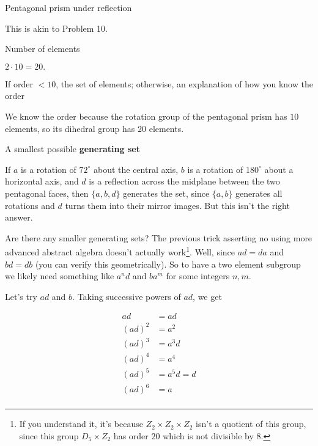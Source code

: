 \documentclass[../gatm_answers.tex]{subfiles}
\begin{document}
\begin{outer_problem}
\item Pentagonal prism under reflection
\end{outer_problem}

This is akin to Problem 10.

\begin{inner_problem}[start=1]
\item Number of elements
\end{inner_problem}

$2\cdot 10=20.$

\begin{inner_problem}
\item If order $< 10$, the set of elements; otherwise, an explanation of how you know the order
\end{inner_problem}

We know the order because the rotation group of the pentagonal prism has $10$ elements, so its dihedral group has $20$ elements.

\begin{inner_problem}
\item A smallest possible \textbf{generating set}
\end{inner_problem}

If $a$ is a rotation of $72^\circ$ about the central axis, $b$ is a rotation of $180^\circ$ about a horizontal axis, and $d$ is a reflection across the midplane between the two pentagonal faces, then $\{a,b,d\}$ generates the set, since $\{a,b\}$ generates all rotations and $d$ turns them into their mirror images. But this isn't the right answer.

Are there any smaller generating sets? The previous trick asserting no using more advanced abstract algebra doesn't actually work\footnote{If you understand it, it's because $Z_2\times Z_2\times Z_2$ isn't a quotient of this group, since this group $D_5 \times Z_2$ has order $20$ which is not divisible by $8$.}. Well, since $ad=da$ and $bd=db$ (you can verify this geometrically). So to have a two element subgroup we likely need something like $a^nd$ and $ba^m$ for some integers $n,m$.

Let's try $ad$ and $b$. Taking successive powers of $ad$, we get

\begin{align*}
ad &= ad \\
(ad)^2 &= a^2 \\
(ad)^3 &= a^3d \\
(ad)^4 &= a^4 \\
(ad)^5 &= a^5d = d \\
(ad)^6 &= a \\
\end{align*}
\end{document}
